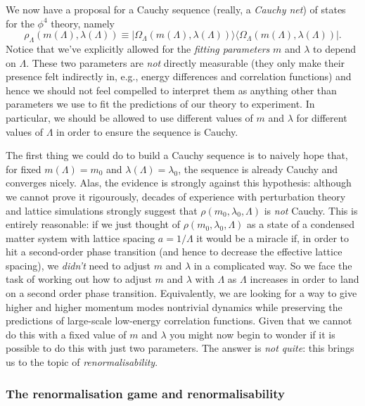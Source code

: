 \documentclass[11pt]{amsart}
\theoremstyle{plain}%
\theoremstyle{definition}
\theoremstyle{remark}
\begin{document}
We now have a proposal for a Cauchy sequence (really, a \emph{Cauchy net}) of states for the $\phi^4$ theory, namely
\begin{equation}
	\rho_{\Lambda}(m(\Lambda),\lambda(\Lambda)) \equiv |\Omega_{\Lambda}(m(\Lambda),\lambda(\Lambda))\rangle\langle\Omega_{\Lambda}(m(\Lambda),\lambda(\Lambda))|.
\end{equation}
Notice that we've explicitly allowed for the \emph{fitting parameters} $m$ and $\lambda$ to depend on $\Lambda$. These two parameters are \emph{not} directly measurable (they only make their presence felt indirectly in, e.g., energy differences and correlation functions) and hence we should not feel compelled to interpret them as anything other than parameters we use to fit the predictions of our theory to experiment. In particular, we should be allowed to use different values of $m$ and $\lambda$ for different values of $\Lambda$ in order to ensure the sequence is Cauchy.

The first thing we could do to build a Cauchy sequence is to naively hope that, for fixed $m(\Lambda) = m_0$ and $\lambda(\Lambda) = \lambda_0$, the sequence is already Cauchy and converges nicely. Alas, the evidence is strongly against this hypothesis: although we cannot prove it rigourously, decades of experience with perturbation theory and lattice simulations strongly suggest that $\rho(m_0,\lambda_0, \Lambda)$ is \emph{not} Cauchy. This is entirely reasonable: if we just thought of $\rho(m_0,\lambda_0, \Lambda)$ as a state of a condensed matter system with lattice spacing $a = 1/\Lambda$ it would be a miracle if, in order to hit a second-order phase transition (and hence to decrease the effective lattice spacing), we \emph{didn't} need to adjust $m$ and $\lambda$ in a complicated way. So we face the task of working out how to adjust $m$ and $\lambda$ with $\Lambda$ as $\Lambda$ increases in order to land on a second order phase transition. Equivalently, we are looking for a way to give higher and higher momentum modes nontrivial dynamics while preserving the predictions of large-scale low-energy correlation functions. Given that we cannot do this with a fixed value of $m$ and $\lambda$ you might now begin to wonder if it is possible to do this with just two parameters. The answer is \emph{not quite}: this brings us to the topic of \emph{renormalisability}.

\subsubsection{The renormalisation game and renormalisability}
\end{document}
